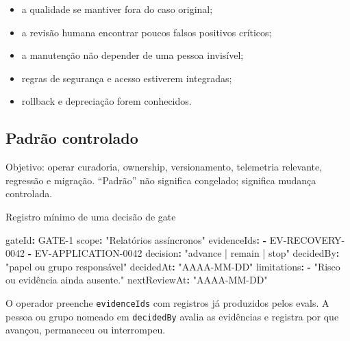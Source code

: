 \documentclass[
  10pt,
  a4paper,
  oneside]{book}
\newenvironment{Shaded}{}{}
\newcommand{\AttributeTok}[1]{\textcolor[rgb]{0.49,0.56,0.16}{#1}}
\newcommand{\FunctionTok}[1]{\textcolor[rgb]{0.02,0.16,0.49}{#1}}
\newcommand{\KeywordTok}[1]{\textcolor[rgb]{0.00,0.44,0.13}{\textbf{#1}}}
\newcommand{\StringTok}[1]{\textcolor[rgb]{0.25,0.44,0.63}{#1}}
\providecommand{\tightlist}{%
  \setlength{\itemsep}{0pt}\setlength{\parskip}{0pt}}
\begin{document}
\begin{itemize}
\tightlist
\item
  a qualidade se mantiver fora do caso original;
\item
  a revisão humana encontrar poucos falsos positivos críticos;
\item
  a manutenção não depender de uma pessoa invisível;
\item
  regras de segurança e acesso estiverem integradas;
\item
  rollback e depreciação forem conhecidos.
\end{itemize}

\hypertarget{padruxe3o-controlado}{%
\subsection{Padrão controlado}\label{padruxe3o-controlado}}

Objetivo: operar curadoria, ownership, versionamento, telemetria
relevante, regressão e migração. ``Padrão'' não significa congelado;
significa mudança controlada.


\begin{examplebox}{Registro mínimo de uma decisão de gate}

\begin{Shaded}
\begin{Highlighting}[]
\FunctionTok{gateId}\KeywordTok{:}\AttributeTok{ GATE{-}1}
\FunctionTok{scope}\KeywordTok{:}\AttributeTok{ }\StringTok{"Relatórios assíncronos"}
\FunctionTok{evidenceIds}\KeywordTok{:}
\AttributeTok{  }\KeywordTok{{-}}\AttributeTok{ EV{-}RECOVERY{-}0042}
\AttributeTok{  }\KeywordTok{{-}}\AttributeTok{ EV{-}APPLICATION{-}0042}
\FunctionTok{decision}\KeywordTok{:}\AttributeTok{ }\StringTok{"advance | remain | stop"}
\FunctionTok{decidedBy}\KeywordTok{:}\AttributeTok{ }\StringTok{"papel ou grupo responsável"}
\FunctionTok{decidedAt}\KeywordTok{:}\AttributeTok{ }\StringTok{"AAAA{-}MM{-}DD"}
\FunctionTok{limitations}\KeywordTok{:}
\AttributeTok{  }\KeywordTok{{-}}\AttributeTok{ }\StringTok{"Risco ou evidência ainda ausente."}
\FunctionTok{nextReviewAt}\KeywordTok{:}\AttributeTok{ }\StringTok{"AAAA{-}MM{-}DD"}
\end{Highlighting}
\end{Shaded}

O operador preenche \texttt{evidenceIds} com registros já produzidos
pelos evals. A pessoa ou grupo nomeado em \texttt{decidedBy} avalia as
evidências e registra por que avançou, permaneceu ou interrompeu.

\end{examplebox}
\end{document}
